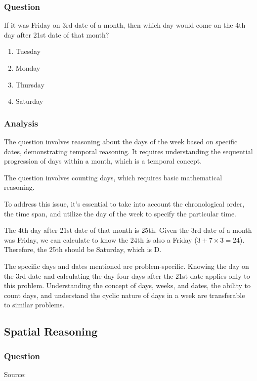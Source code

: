 \documentclass[12pt, a4paper]{article}
\begin{document}
\subsubsection*{Question}
If it was Friday on 3rd date of a month, then which day would come on the 4th day after 21st date of that month?

\begin{enumerate}[label=(\Alph*)]
    \item Tuesday
    \item Monday
    \item Thursday
    \item Saturday
\end{enumerate}

\subsubsection*{Analysis}
The question involves reasoning about the days of the week based on specific dates, demonstrating temporal reasoning. It requires understanding the sequential progression of days within a month, which is a temporal concept.

The question involves counting days, which requires basic mathematical reasoning.

To address this issue, it's essential to take into account the chronological order, the time span, and utilize the day of the week to specify the particular time.

The 4th day after 21st date of that month is 25th. Given the 3rd date of a month was Friday, we can calculate to know the 24th is also a Friday ($3 + 7 \times 3 = 24$). Therefore, the 25th should be Saturday, which is D.

The specific days and dates mentioned are problem-specific. Knowing the day on the 3rd date and calculating the day four days after the 21st date applies only to this problem. Understanding the concept of days, weeks, and dates, the ability to count days, and understand the cyclic nature of days in a week are transferable to similar problems.

\subsection*{Spatial Reasoning}
\subsubsection*{Question}
Source: \cite{Gajanand_2022a}
\end{document}
